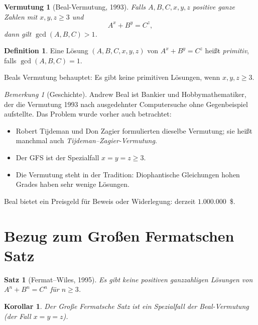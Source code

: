 \documentclass[12pt,a4paper]{amsart}
\newtheorem{satz}[theorem]{Satz}
\newtheorem{korollar}[theorem]{Korollar}
\newtheorem{vermutung}[theorem]{Vermutung}
\theoremstyle{definition}
\newtheorem{definition_de}[theorem]{Definition}
\theoremstyle{remark}
\newtheorem{bemerkung}[theorem]{Bemerkung}
\begin{document}
\begin{vermutung}[Beal-Vermutung, 1993]\label{verm:beal}
Falls $A, B, C, x, y, z$ positive ganze Zahlen mit $x, y, z \geq 3$ und
\[
  A^x + B^y = C^z,
\]
dann gilt $\gcd(A, B, C) > 1$.
\end{vermutung}

\begin{definition_de}
Eine Lösung $(A, B, C, x, y, z)$ von $A^x + B^y = C^z$ heißt \emph{primitiv}, falls
$\gcd(A, B, C) = 1$.
\end{definition_de}

Beals Vermutung behauptet: Es gibt keine primitiven Lösungen, wenn $x, y, z \geq 3$.

\begin{bemerkung}[Geschichte]
Andrew Beal ist Bankier und Hobbymathematiker, der die Vermutung 1993 nach
ausgedehnter Computersuche ohne Gegenbeispiel aufstellte. Das Problem wurde
vorher auch betrachtet:
\begin{itemize}
  \item Robert Tijdeman und Don Zagier formulierten dieselbe Vermutung; sie heißt
        manchmal auch \emph{Tijdeman--Zagier-Vermutung}.
  \item Der GFS ist der Spezialfall $x = y = z \geq 3$.
  \item Die Vermutung steht in der Tradition: Diophantische Gleichungen hohen
        Grades haben sehr wenige Lösungen.
\end{itemize}
Beal bietet ein Preisgeld für Beweis oder Widerlegung: derzeit $1{.}000{.}000$~\$.
\end{bemerkung}

\section{Bezug zum Großen Fermatschen Satz}

\begin{satz}[Fermat--Wiles, 1995]\label{satz:GFS}
Es gibt keine positiven ganzzahligen Lösungen von $A^n + B^n = C^n$ für $n \geq 3$.
\end{satz}

\begin{korollar}
Der Große Fermatsche Satz ist ein Spezialfall der Beal-Vermutung (der Fall $x = y = z$).
\end{korollar}
\end{document}
